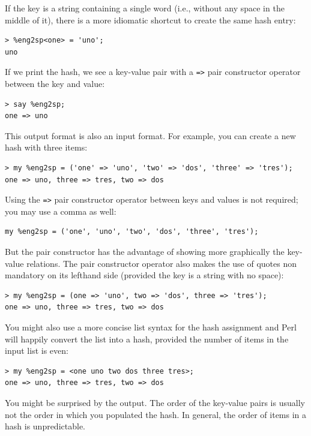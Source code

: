 If the key is a string containing a single word (i.e., 
without any space in the middle of it), there is a more 
idiomatic shortcut to create the same hash entry:

\begin{verbatim}
> %eng2sp<one> = 'uno';
uno
\end{verbatim}
%

If we print the hash, we see a key-value pair with a 
\verb'=>' pair constructor operator between the key 
and value:

\begin{verbatim}
> say %eng2sp;
one => uno
\end{verbatim}
%
This output format is also an input format.  For example,
you can create a new hash with three items:

\begin{verbatim}
> my %eng2sp = ('one' => 'uno', 'two' => 'dos', 'three' => 'tres');
one => uno, three => tres, two => dos
\end{verbatim}
%

Using the \verb'=>' pair constructor operator between keys and 
values is not required; you may use a comma as well:

\begin{verbatim}
my %eng2sp = ('one', 'uno', 'two', 'dos', 'three', 'tres');
\end{verbatim}
%

But the pair constructor has the advantage of showing more 
graphically the key-value relations. The pair constructor 
operator also makes the use of quotes non mandatory on its 
lefthand side (provided the key is a string with no space):

\begin{verbatim}
> my %eng2sp = (one => 'uno', two => 'dos', three => 'tres');
one => uno, three => tres, two => dos
\end{verbatim}
%

You might also use a more concise list syntax for the hash 
assignment and Perl will happily convert the list into a 
hash, provided the number of items in the input list is even:

\begin{verbatim}
> my %eng2sp = <one uno two dos three tres>;
one => uno, three => tres, two => dos
\end{verbatim}
%

You might be surprised by the output. The order of the 
key-value pairs is usually not the order in which you 
populated the hash. In general, the order 
of items in a hash is unpredictable.

